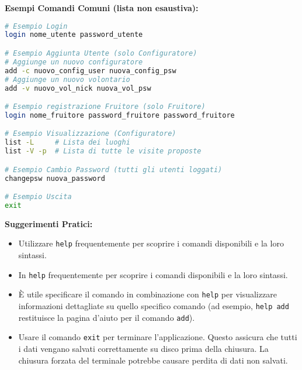 \documentclass[a4paper,12pt]{article}
\begin{document}
    \textbf{Esempi Comandi Comuni (lista non esaustiva):}
    \begin{lstlisting}[language=bash, numbers=none, frame=lines, rulecolor=\color{lightgray}]
# Esempio Login
login nome_utente password_utente

# Esempio Aggiunta Utente (solo Configuratore)
# Aggiunge un nuovo configuratore
add -c nuovo_config_user nuova_config_psw
# Aggiunge un nuovo volontario
add -v nuovo_vol_nick nuova_vol_psw

# Esempio registrazione Fruitore (solo Fruitore)
login nome_fruitore password_fruitore password_fruitore

# Esempio Visualizzazione (Configuratore)
list -L     # Lista dei luoghi
list -V -p  # Lista di tutte le visite proposte

# Esempio Cambio Password (tutti gli utenti loggati)
changepsw nuova_password

# Esempio Uscita
exit

    \end{lstlisting}

    \textbf{\newline Suggerimenti Pratici:}
    \begin{itemize}
        \item Utilizzare \texttt{help} frequentemente per scoprire i comandi disponibili e la loro sintassi.
        \item In \texttt{help} frequentemente per scoprire i comandi disponibili e la loro sintassi.
        \item È utile specificare il comando in combinazione con \texttt{help} per visualizzare informazioni dettagliate su quello specifico comando (ad esempio, \texttt{help add} restituisce la pagina d'aiuto per il comando \texttt{add}).
        \item Usare il comando \texttt{exit} per terminare l'applicazione. Questo assicura che tutti i dati vengano salvati correttamente su disco prima della chiusura. La chiusura forzata del terminale potrebbe causare perdita di dati non salvati.
    \end{itemize}
\end{document}
